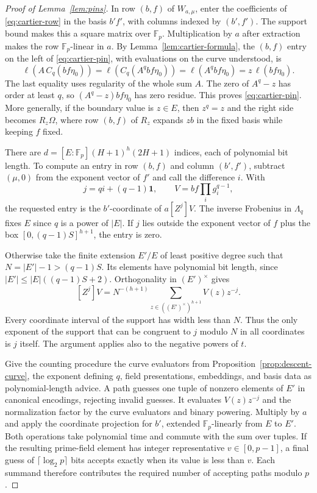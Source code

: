 \begin{proof}[Proof of Lemma~\ref{lem:pins}]
In row $(b,f)$ of $W_{a,\mu}$, enter the coefficients of
\eqref{eq:cartier-row} in the basis $b'f'$, with columns indexed
by $(b',f')$. The support bound makes this a square matrix over
$\mathbb F_p$. Multiplication by $a$ after extraction makes the
row $\mathbb F_p$-linear in $a$. By
Lemma~\ref{lem:cartier-formula}, the $(b,f)$ entry on the left of
\eqref{eq:cartier-pin}, with evaluations on the curve understood, is
\[
   \ell\!\left(A\,C_q(bf\eta_0)\right)
    =\ell\!\left(C_q(A^q bf\eta_0)\right)
    =\ell(A^q bf\eta_0)=z\,\ell(bf\eta_0).
\]
The last equality uses regularity of the whole sum $A$. The zero
of $A^q-z$ has order at least $q$, so $(A^q-z)bf\eta_0$ has zero
residue. This proves \eqref{eq:cartier-pin}. More generally, if
the boundary value is $z\in E$, then $z^q=z$ and the right side
becomes $R_z\Omega$, where row $(b,f)$ of $R_z$ expands $zb$ in
the fixed basis while keeping $f$ fixed.

There are $d=[E:\mathbb F_p](H+1)^h(2H+1)$ indices, each of
polynomial bit length. To compute an entry in row $(b,f)$ and
column $(b',f')$, subtract $(\mu,0)$ from the exponent vector of
$f'$ and call the difference $i$. With
\[
       j=qi+(q-1)\mathbf1,\qquad V=bf\prod_i g_i^{q-1},
\]
the requested entry is the $b'$-coordinate of $a[Z^j]V$. The
inverse Frobenius in $\Lambda_q$ fixes $E$ since $q$ is a power
of $|E|$. If $j$ lies outside the exponent vector of $f$ plus
the box $[0,(q-1)S]^{h+1}$, the entry is zero.

Otherwise take the finite extension $E'/E$ of least positive degree
such that $N=|E'|-1>(q-1)S$. Its elements have polynomial bit length,
since $|E'|\le |E|((q-1)S+2)$. Orthogonality in $(E')^\times$
gives
\[
       [Z^j]V=N^{-(h+1)}
           \sum_{z\in((E')^\times)^{h+1}} V(z)z^{-j}.
\]
Every coordinate interval of the support has width less than $N$.
Thus the only exponent of the support that can be congruent to $j$
modulo $N$ in all coordinates is $j$ itself. The argument applies
also to the negative powers of $t$.

Give the counting procedure the curve evaluators from
Proposition~\ref{prop:descent-curve}, the exponent defining $q$, field
presentations, embeddings, and basis data as polynomial-length advice. A path guesses one tuple
of nonzero elements of $E'$ in canonical encodings, rejecting invalid
guesses. It evaluates $V(z)z^{-j}$ and the normalization factor by
the curve evaluators and binary powering. Multiply by $a$ and apply
the coordinate projection for $b'$, extended $\mathbb F_p$-linearly
from $E$ to $E'$. Both operations take polynomial time and commute
with the sum over tuples. If the resulting prime-field element has
integer representative $v\in[0,p-1]$, a final guess of
$\lceil\log_2 p\rceil$ bits accepts exactly when its value is less
than $v$. Each summand therefore contributes the required number
of accepting paths modulo $p$.


\end{proof}
